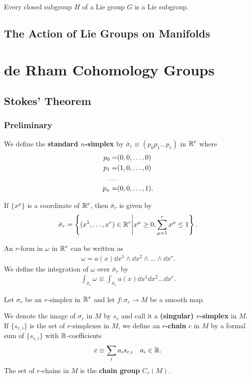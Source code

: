 \documentclass[10pt]{article}
\begin{document}
\begin{theorem}
    Every closed subgroup $H$ of a Lie group $G$ is a Lie subgroup.
\end{theorem}


\subsection{The Action of Lie Groups on Manifolds}

\clearpage
\section{de Rham Cohomology Groups}
\subsection{Stokes' Theorem}
\subsubsection{Preliminary}
\begin{definition}
    We define the \textbf{standard $n$-simplex} by $\bar{\sigma}_r\equiv(p_0 p_1\dots p_r)$ in $\mathbb{R}^r$ where
    \begin{align}
        p_0= & (0,0,\dots,0)\notag  \\
        p_1= & (1,0,\dots,0)\notag  \\
        \dots\notag                 \\
        p_n= & (0,0,\dots,1).\notag
    \end{align}
\end{definition}
If $\{x^\mu\}$ is a coordinate of $\mathbb{R}^r$, then $\bar{\sigma}_r$ is given by
\begin{align}
    \bar{\sigma}_r=\left\{(x^1,\dots,x^r)\in\mathbb{R}^r\Bigg| x^\mu\geq0,\sum_{\mu=1}^{r}x^\mu\leq1\right\}.
\end{align}

An $r$-form in $\omega$ in $\mathbb{R}^r$ can be written as
\begin{align}
    \omega=a(x)\dd{x^1}\wedge\dd{x^2}\wedge\dots\wedge\dd{x^r}.
\end{align}
We define the integration of $\omega$ over $\bar{\sigma}_r$ by
\begin{align}
    \int_{\bar{\sigma}_r}\omega\equiv\int_{\bar{\sigma}_r}a(x)\dd{x^1}\dd{x^2}\dots\dd{x^r}.
\end{align}

Let $\sigma_r$ be an $r$-simplex in $\mathbb{R}^r$ and let $f:\sigma_r\to M$ be a smooth map.
\begin{definition}
    We denote the image of $\sigma_r$ in $M$ by $s_r$ and call it a \textbf{(singular) $r$-simplex} in $M$.
    If $\{s_{r,i}\}$ is the set of $r$-simplexes in $M$, we define an \textbf{$r$-chain} $c$ in $M$ by a formal sum of $\{s_{r,i}\}$ with $\mathbb{R}$-coefficients
    \begin{align}
        c\equiv\sum_i a_i s_{r,i}\quad a_i\in\mathbb{R}.
    \end{align}
    The set of $r$-chains in $M$ is the \textbf{chain group} $C_r(M)$.
\end{definition}
\end{document}
